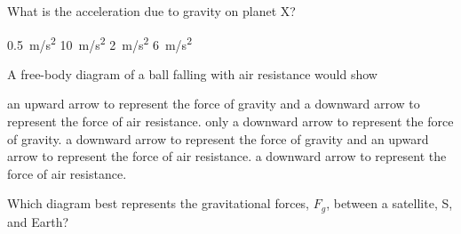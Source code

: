 \documentclass[answers]{exam}
\begin{document}
\begin{questions}
What is the acceleration due to gravity on planet X?

\begin{randomizechoices}[norandomize]
    \correctchoice \SI{0.5}{m/s^2}
    \choice \SI{10}{m/s^2}
    \choice \SI{2}{m/s^2}
    \choice \SI{6}{m/s^2}
\end{randomizechoices}

\question
A free-body diagram of a ball falling with air resistance would show

\begin{center}
\end{center}

\begin{randomizechoices}[norandomize]
    \choice an upward arrow to represent the force of gravity and a downward arrow to represent the force of air resistance.
    \choice only a downward arrow to represent the force of gravity.
    \correctchoice a downward arrow to represent the force of gravity and an upward arrow to represent the force of air resistance.
    \choice a downward arrow to represent the force of air resistance.
\end{randomizechoices}


\clearpage
\question
Which diagram best represents the gravitational forces, $F_g$, between a satellite, S, and Earth?


\end{questions}
\end{document}
